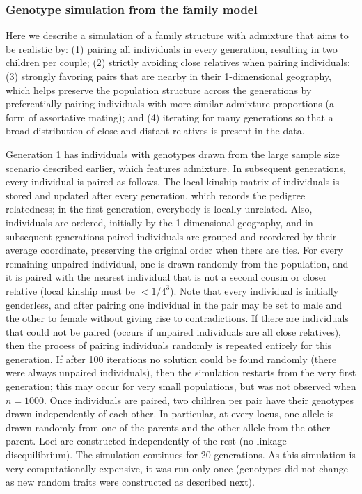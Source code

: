 \documentclass[11pt]{article}
\begin{document}
\subsubsection{Genotype simulation from the family model}

Here we describe a simulation of a family structure with admixture that aims to be realistic by:
(1) pairing all individuals in every generation, resulting in two children per couple;
(2) strictly avoiding close relatives when pairing individuals;
(3) strongly favoring pairs that are nearby in their 1-dimensional geography, which helps preserve the population structure across the generations by preferentially pairing individuals with more similar admixture proportions (a form of assortative mating); and
(4) iterating for many generations so that a broad distribution of close and distant relatives is present in the data.

Generation 1 has individuals with genotypes drawn from the large sample size scenario described earlier, which features admixture.
In subsequent generations, every individual is paired as follows.
The local kinship matrix of individuals is stored and updated after every generation, which records the pedigree relatedness; in the first generation, everybody is locally unrelated.
Also, individuals are ordered, initially by the 1-dimensional geography, and in subsequent generations paired individuals are grouped and reordered by their average coordinate, preserving the original order when there are ties.
For every remaining unpaired individual, one is drawn randomly from the population, and it is paired with the nearest individual that is not a second cousin or closer relative (local kinship must be $< 1/4^3$).
Note that every individual is initially genderless, and after pairing one individual in the pair may be set to male and the other to female without giving rise to contradictions.
If there are individuals that could not be paired (occurs if unpaired individuals are all close relatives), then the process of pairing individuals randomly is repeated entirely for this generation.
If after 100 iterations no solution could be found randomly (there were always unpaired individuals), then the simulation restarts from the very first generation; this may occur for very small populations, but was not observed when $n = 1000$.
Once individuals are paired, two children per pair have their genotypes drawn independently of each other.
In particular, at every locus, one allele is drawn randomly from one of the parents and the other allele from the other parent.
Loci are constructed independently of the rest (no linkage disequilibrium).
The simulation continues for 20 generations.
As this simulation is very computationally expensive, it was run only once (genotypes did not change as new random traits were constructed as described next).
\end{document}
